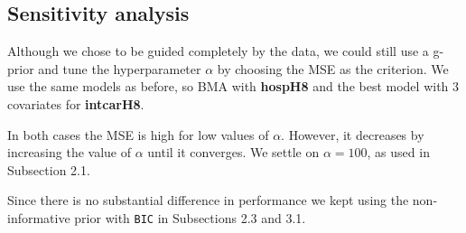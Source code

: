 \documentclass[12pt,a4paper]{article}
\theoremstyle{definition}
\theoremstyle{remark}
\begin{document}
\clearpage
\newpage
\subsection{Sensitivity analysis}
Although we chose to be guided completely by the data,  we could still use a g-prior and tune the hyperparameter $\alpha$ by choosing the MSE as the criterion. We use the same models as before, so BMA with \textbf{hospH8} and the best model with 3 covariates for \textbf{intcarH8}.

In both cases the MSE is high for low values of $\alpha$. However, it decreases by increasing the value of $\alpha$ until it converges. We settle on $\alpha = 100$, as used in Subsection 2.1. 

Since there is no substantial difference in performance we kept using the non-informative prior with \texttt{BIC} in Subsections 2.3 and 3.1.
\end{document}
